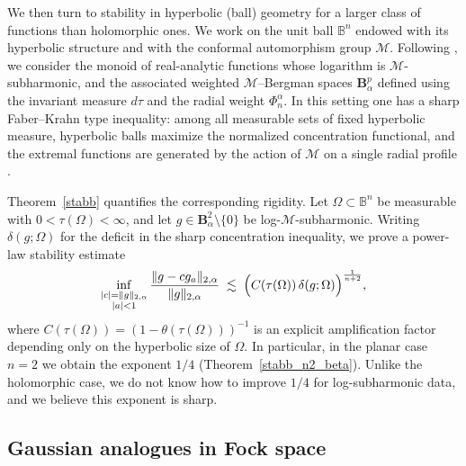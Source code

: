 \documentclass[a4paper,10pt]{amsart}
\begin{document}
We then turn to stability in hyperbolic (ball) geometry for a larger class of functions than
holomorphic ones. We work on the unit ball $\mathbb B^n$ endowed with its hyperbolic structure and
with the conformal automorphism group $\mathcal M$. Following \cite{kalaj2024,kalajramos2024}, we
consider the monoid of real-analytic functions whose logarithm is $\mathcal M$-subharmonic, and the
associated weighted $\mathcal M$--Bergman spaces $\mathbf B_\alpha^p$ defined using the invariant
measure $d\tau$ and the radial weight $\Phi_n^\alpha$. In this setting one has a sharp Faber--Krahn
type inequality: among all measurable sets of fixed hyperbolic measure, hyperbolic balls maximize
the normalized concentration functional, and the extremal functions are generated by the action of
$\mathcal M$ on a single radial profile \cite{RamosTilli,kalajramos2024}.

Theorem~\ref{stabb} quantifies the corresponding rigidity.
Let $\Omega\subset\mathbb B^n$ be measurable with $0<\tau(\Omega)<\infty$, and let
$g\in \mathbf B_\alpha^2\setminus\{0\}$ be log-$\mathcal M$-subharmonic.
Writing $\delta(g;\Omega)$ for the deficit in the sharp concentration inequality, we prove a
power-law stability estimate
\[
\inf_{\substack{|c|=\|g\|_{2,\alpha}\\ |a|<1}}
\frac{\|g-cg_a\|_{2,\alpha}}{\|g\|_{2,\alpha}}
\;\lesssim\;
\Bigl(C(\tau(\Omega))\,\delta(g;\Omega)\Bigr)^{\frac{1}{n+2}},
\]
where $C(\tau(\Omega))=(1-\theta(\tau(\Omega)))^{-1}$ is an explicit amplification factor depending
only on the hyperbolic size of $\Omega$. In particular, in the planar case $n=2$ we obtain the
exponent $1/4$ (Theorem~\ref{stabb_n2_beta}). Unlike the holomorphic case, we do not know how to
improve $1/4$ for log-subharmonic data, and we believe this exponent is sharp.

\subsection{Gaussian analogues in Fock space}
\end{document}
